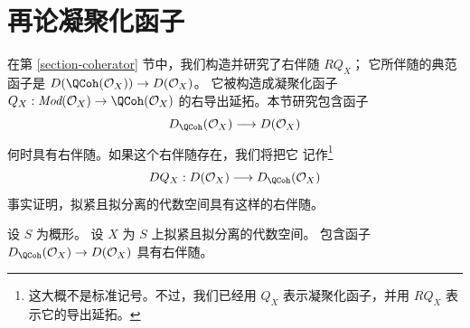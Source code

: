 \section{再论凝聚化函子}
\label{section-better-coherator}

\noindent
在第 \ref{section-coherator} 节中，我们构造并研究了右伴随 $RQ_X$；
它所伴随的典范函子是
$D(\QCoh(\mathcal{O}_X)) \to D(\mathcal{O}_X)$。
它被构造成凝聚化函子
$Q_X : \textit{Mod}(\mathcal{O}_X) \to \QCoh(\mathcal{O}_X)$
的右导出延拓。本节研究包含函子
$$
D_\QCoh(\mathcal{O}_X) \longrightarrow D(\mathcal{O}_X)
$$
何时具有右伴随。如果这个右伴随存在，我们将把它
记作\footnote{这大概不是标准记号。不过，我们已经用 $Q_X$
表示凝聚化函子，并用 $RQ_X$ 表示它的导出延拓。}
$$
DQ_X :
D(\mathcal{O}_X) \longrightarrow D_\QCoh(\mathcal{O}_X)
$$
事实证明，拟紧且拟分离的代数空间具有这样的右伴随。

\begin{lemma}
\label{lemma-better-coherator}
设 $S$ 为概形。
设 $X$ 为 $S$ 上拟紧且拟分离的代数空间。
包含函子 $D_\QCoh(\mathcal{O}_X) \to D(\mathcal{O}_X)$ 具有右伴随。
\end{lemma}

